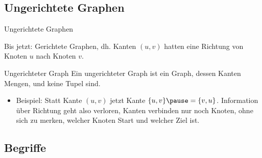 \documentclass[handout]{beamer}
\begin{document}
\subsection{Ungerichtete Graphen}
\begin{frame}{Ungerichtete Graphen}
	\begin{itemize}
		\pitem Bis jetzt\ip: Gerichtete Graphen, dh. Kanten $(u,v)$ hatten eine Richtung von Knoten $u$ nach Knoten $v$.
	\end{itemize}

	\bp
	
	\begin{block}{Ungerichteter Graph}
		Ein ungerichteter Graph ist ein Graph, dessen Kanten Mengen, und keine Tupel sind.
	\end{block}

	\bp
	
	\begin{itemize}
		\item Beispiel: Statt Kante $(u,v)$ jetzt Kante $\{u,v\} \pause = \{v, u\}$.
		\pitem Information über Richtung geht also verloren, Kanten verbinden nur noch Knoten, ohne sich zu merken, welcher Knoten Start und welcher Ziel ist.
	\end{itemize}
\end{frame}

\subsection{Begriffe}
\end{document}
